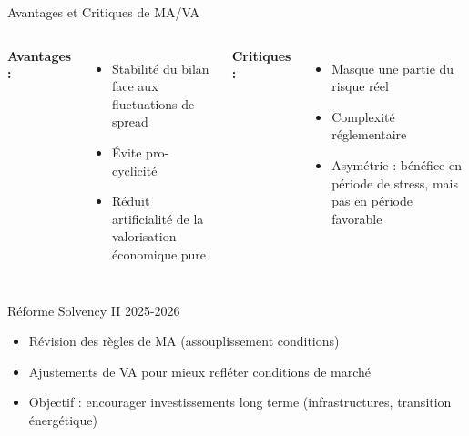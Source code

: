 \documentclass[10pt,aspectratio=169]{beamer}
\begin{document}
\begin{frame}{Avantages et Critiques de MA/VA}
\begin{columns}
\textbf{Avantages :}
\begin{itemize}
    \item[\checkmark] Stabilité du bilan face aux fluctuations de spread
    \item[\checkmark] Évite pro-cyclicité
    \item[\checkmark] Réduit artificialité de la valorisation économique pure
\end{itemize}

\textbf{Critiques :}
\begin{itemize}
    \item[\texttimes] Masque une partie du risque réel
    \item[\texttimes] Complexité réglementaire
    \item[\texttimes] Asymétrie : bénéfice en période de stress, mais pas en période favorable
\end{itemize}
\end{columns}

\vspace{0.3cm}
\begin{alertblock}{Réforme Solvency II 2025-2026}
\begin{itemize}
    \item Révision des règles de MA (assouplissement conditions)
    \item Ajustements de VA pour mieux refléter conditions de marché
    \item Objectif : encourager investissements long terme (infrastructures, transition énergétique)
\end{itemize}
\end{alertblock}
\end{frame}
\end{document}
